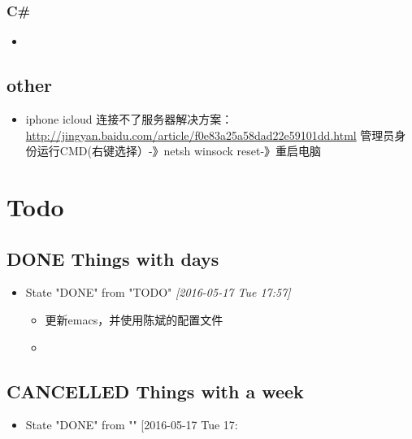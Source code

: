 \documentclass[11pt]{article}
\begin{document}
\subsubsection{C\#}
\label{sec-1-2-8}
\begin{itemize}
\item 
\end{itemize}

\subsection{other}
\label{sec-1-3}
\begin{itemize}
\item iphone icloud 连接不了服务器解决方案：\url{http://jingyan.baidu.com/article/f0e83a25a58dad22e59101dd.html}
                                       管理员身份运行CMD(右键选择）-》netsh winsock reset-》重启电脑
\end{itemize}




\section{Todo}
\label{sec-2}
\subsection{{\bfseries\sffamily DONE} Things with days}
\label{sec-2-1}
\begin{itemize}
\item State "DONE"       from "TODO"       \textit{[2016-05-17 Tue 17:57]}
\begin{itemize}
\item 更新emacs，并使用陈斌的配置文件
\item 
\end{itemize}
\end{itemize}
\subsection{{\bfseries\sffamily CANCELLED} Things with a week}
\label{sec-2-2}
\begin{itemize}
\item State "DONE"       from ""           [2016-05-17 Tue 17:
\end{itemize}
\end{document}
